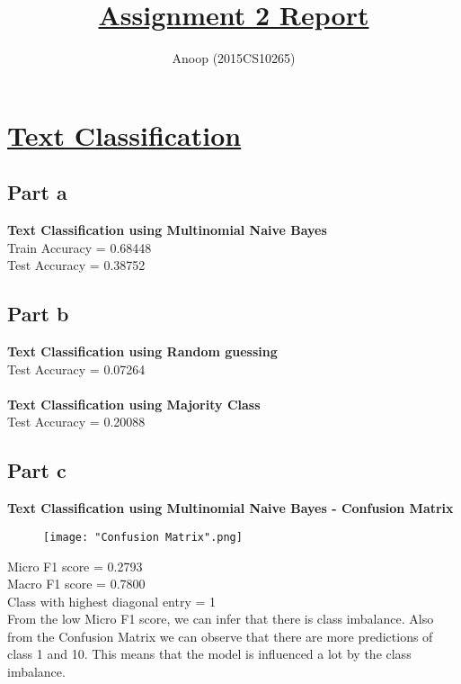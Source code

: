 \documentclass[12pt]{article}
\title{\textbf{\underline{Assignment 2 Report}}}
\author{Anoop (2015CS10265)}
\begin{document}
\maketitle

\section*{\underline{Text Classification}}
\subsection*{Part a}
\begin{addmargin}[0.3in]{0in}
\textbf{Text Classification using Multinomial Naive Bayes}\\
Train Accuracy = 0.68448\\
Test Accuracy = 0.38752
\end{addmargin}
\subsection*{Part b}
\begin{addmargin}[0.3in]{0in}
\textbf{Text Classification using Random guessing}\\
Test Accuracy = 0.07264\\ \\
\textbf{Text Classification using Majority Class}\\
Test Accuracy = 0.20088
\end{addmargin}
\subsection*{Part c}
\textbf{  Text Classification using Multinomial Naive Bayes - Confusion Matrix}\\
\begin{wrapfigure}[10]{l}{0.5\textwidth}
\texttt{[image: "Confusion Matrix".png]}
\end{wrapfigure}
\begin{addmargin}[0.3in]{0in}
Micro F1 score = 0.2793\\
Macro F1 score = 0.7800\\
Class with highest diagonal entry = 1\\
From the low Micro F1 score, we can infer that there is class imbalance. Also from the Confusion Matrix we can observe that there are more predictions of class 1 and 10. This means that the model is influenced a lot by the class imbalance.
\end{addmargin}
\newpage
\end{document}
